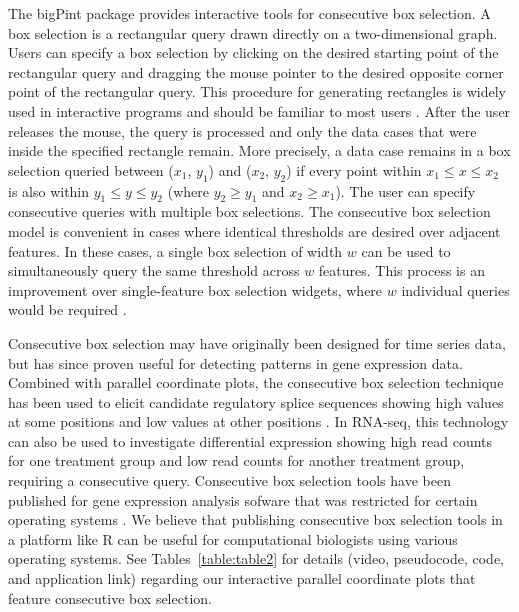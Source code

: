 \documentclass[parskip=full]{bmcart} %
\begin{document}
The bigPint package provides interactive tools for consecutive box selection. A box selection is a rectangular query drawn directly on a two-dimensional graph. Users can specify a box selection by clicking on the desired starting point of the rectangular query and dragging the mouse pointer to the desired opposite corner point of the rectangular query. This procedure for generating rectangles is widely used in interactive programs and should be familiar to most users \cite{hochheiser2003dynamic}. After the user releases the mouse, the query is processed and only the data cases that were inside the specified rectangle remain. More precisely, a data case remains in a box selection queried between ($x_1$, $y_1$) and ($x_2$, $y_2$) if every point within $x_1 \leq x \leq x_2$ is also within $y_1 \leq y \leq y_2$ (where $y_2 \geq y_1$ and $x_2 \geq x_1$). The user can specify consecutive queries with multiple box selections. The consecutive box selection model is convenient in cases where identical thresholds are desired over adjacent features. In these cases, a single box selection of width $w$ can be used to simultaneously query the same threshold across $w$ features. This process is an improvement over single-feature box selection widgets, where $w$ individual queries would be required \cite{hochheiser2003dynamic}. 

Consecutive box selection may have originally been designed for time series data, but has since proven useful for detecting patterns in gene expression data. Combined with parallel coordinate plots, the consecutive box selection technique has been used to elicit candidate regulatory splice sequences showing high values at some positions and low values at other positions \cite{hochheiser2003dynamic}. In RNA-seq, this technology can also be used to investigate differential expression showing high read counts for one treatment group and low read counts for another treatment group, requiring a consecutive query. Consecutive box selection tools have been published for gene expression analysis sofware that was restricted for certain operating systems \cite{hochheiser2003dynamic}. We believe that publishing consecutive box selection tools in a platform like R can be useful for computational biologists using various operating systems. See Tables~\ref{table:table2} for details (video, pseudocode, code, and application link) regarding our interactive parallel coordinate plots that feature consecutive box selection.

\end{document}
